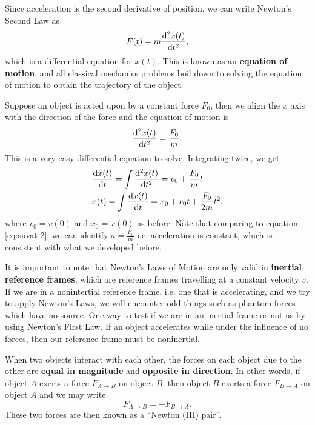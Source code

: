 \documentclass[../classical_mechanics.tex]{subfiles}
\begin{document}
        Since acceleration is the second derivative of position, we can write Newton's Second Law as
        \begin{equation}
            F(t)=m\dv[2]{x(t)}{t},
        \end{equation}
        which is a differential equation for $x(t)$.
        This is known as an \textbf{equation of motion}, and all classical mechanics problems boil down to solving the equation of motion to obtain the trajectory of the object.
        \begin{example}
            Suppose an object is acted upon by a constant force $F_0$, then we align the $x$ axis with the direction of the force and the equation of motion is
            \begin{equation*}
                \dv[2]{x(t)}{t}=\frac{F_0}{m}.
            \end{equation*}
            This is a very easy differential equation to solve.
            Integrating twice, we get
            \begin{align*}
                &\dv{x(t)}{t}=\int\dv[2]{x(t)}{t}=v_0+\frac{F_0}{m}t\\
                &x(t)=\int\dv{x(t)}{t}=x_0+v_0t+\frac{F_0}{2m}t^2,
            \end{align*}
            where $v_0=v(0)$ and $x_0=x(0)$ as before.
            Note that comparing to equation \ref{eq:suvat-2}, we can identify $a=\frac{F_0}{m}$ i.e. acceleration is constant, which is consistent with what we developed before.
        \end{example}
        It is important to note that Newton's Laws of Motion are only valid in \textbf{inertial reference frames}, which are reference frames travelling at a constant velocity $v$.
        If we are in a nonintertial reference frame, i.e. one that is accelerating, and we try to apply Newton's Laws, we will encounter odd things such as phantom forces which have no source.
        One way to test if we are in an inertial frame or not us by using Newton's First Law.
        If an object accelerates while under the influence of no forces, then our reference frame must be noninertial.
        \begin{definition}\label{def:newton-3}
            When two objects interact with each other, the forces on each object due to the other are \textbf{equal in magnitude} and \textbf{opposite in direction}.
            In other words, if object $A$ exerts a force $F_{A\to B}$ on object $B$, then object $B$ exerts a force $F_{B\to A}$ on object $A$ and we may write
            \begin{equation}
                F_{A\to B}=-F_{B\to A}.
            \end{equation}
            These two forces are then known as a ``Newton (III) pair''.
        \end{definition}
\end{document}

